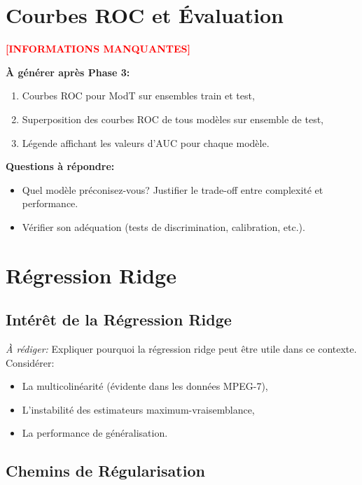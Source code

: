 \documentclass[11pt,a4paper,french]{report}
\begin{document}
\section{Courbes ROC et Évaluation}

\textcolor{red}{\textbf{[INFORMATIONS MANQUANTES]}}

\textbf{À générer après Phase 3:}

\begin{enumerate}
    \item Courbes ROC pour ModT sur ensembles train et test,
    \item Superposition des courbes ROC de tous modèles sur ensemble de test,
    \item Légende affichant les valeurs d'AUC pour chaque modèle.
\end{enumerate}

\textbf{Questions à répondre:}

\begin{itemize}
    \item Quel modèle préconisez-vous? Justifier le trade-off entre complexité et performance.
    \item Vérifier son adéquation (tests de discrimination, calibration, etc.).
\end{itemize}

\section{Régression Ridge}

\subsection{Intérêt de la Régression Ridge}

\textit{À rédiger:} Expliquer pourquoi la régression ridge peut être utile dans ce contexte. Considérer:
\begin{itemize}
    \item La multicolinéarité (évidente dans les données MPEG-7),
    \item L'instabilité des estimateurs maximum-vraisemblance,
    \item La performance de généralisation.
\end{itemize}

\subsection{Chemins de Régularisation}
\end{document}

